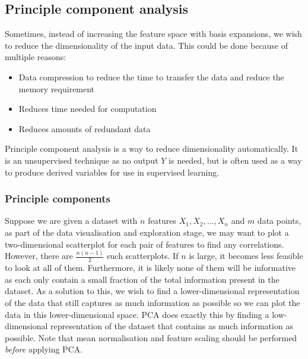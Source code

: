 \documentclass[CS5104-Notes.tex]{subfiles}
\begin{document}
\subsection{Principle component analysis}
Sometimes, instead of increasing the feature space with basis expansions, we wish to reduce the dimensionality of the input data. This could be done because of multiple reasons:
\begin{itemize}
\item Data compression to reduce the time to transfer the data and reduce the memory requirement
\item Reduces time needed for computation
\item Reduces amounts of redundant data
\end{itemize}
Principle component analysis is a way to reduce dimensionality automatically. It is an unsupervised technique as no output $Y$ is needed, but is often used as a way to produce derived variables for use in supervised learning.

\subsubsection{Principle components}
Suppose we are given a dataset with $n$ features $X_{1}, X_{2}, ..., X_{n}$ and $m$ data points, as part of the data visualisation and exploration stage, we may want to plot a two-dimensional scatterplot for each pair of features to find any correlations. However, there are $\frac{n(n-1)}{2}$ such scatterplots. If $n$ is large, it becomes less feasible to look at all of them. Furthermore, it is likely none of them will be informative as each only contain a small fraction of the total information present in the dataset. As a solution to this, we wish to find a lower-dimensional representation of the data that still captures as much information as possible so we can plot the data in this lower-dimensional space.
\n
PCA does exactly this by finding a low-dimensional representation of the dataset that contains as much information as possible. Note that mean normalisation and feature scaling should be performed \textit{before} applying PCA. 
\end{document}
